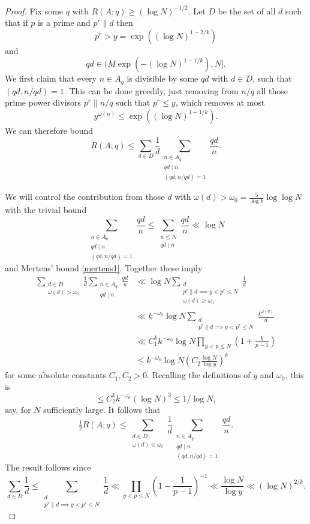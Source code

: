 \documentclass[12pt]{amsart}
\newcommand{\brac}[1]{\left( #1\right)}
\begin{document}
\begin{proof}
Fix some $q$ with $R(A;q)\geq (\log N)^{-1/2}$. Let $D$ be the set of all $d$ such that if $p$ is a prime and $p^r \| d$ then 
\[p^r>y=\exp((\log N)^{1-2/k})\]
and 
\[qd\in (M\exp(-(\log N)^{1-1/k}),N].\]
We first claim that every $n\in A_q$ is divisible by some $qd$ with $d\in D$, such that $(qd,n/qd)=1$. This can be done greedily, just removing from $n/q$ all those prime power divisors $p^r\| n/q$ such that $p^r\leq y$, which removes at most 
\[y^{\omega(n)}\leq  \exp((\log N)^{1-1/k}).\]
We can therefore bound
\[R(A;q) \leq \sum_{d\in D}\frac{1}{d}\sum_{\substack{n\in A_q\\ qd\mid n\\ (qd,n/qd)=1}}\frac{qd}{n}.\]

We will control the contribution from those $d$ with $\omega(d)>\omega_0= \frac{5}{\log k}\log\log N$ with the trivial bound
\[\sum_{\substack{n\in A_q\\ qd\mid n\\ (qd,n/qd)=1}}\frac{qd}{n} \leq \sum_{\substack{n\leq N\\ qd\mid n}}\frac{qd}{n}\ll \log N\]
and Mertens' bound \eqref{mertens1}. Together these imply
\begin{align*}
\sum_{\substack{d\in D\\ \omega(d)>\omega_0}}\frac{1}{d}\sum_{\substack{n\in A_q\\ qd\mid n}}\frac{qd}{n}
&\ll \log N\sum_{\substack{d\\ p^r\| d\implies y<p^r\leq N\\ \omega(d)\geq \omega_0}} \frac{1}{d}\\
&\ll
k^{-\omega_0}\log N\sum_{\substack{d\\ p^r\| d\implies y<p^r\leq N}} \frac{k^{\omega(d)}}{d}\\
&\ll C_1^kk^{-\omega_0}\log N\prod_{y<p\leq N}(1+\frac{k}{p-1}) \\
 &\leq k^{-\omega_0}\log N\brac{C_2\frac{\log N}{\log y}}^{k}
\end{align*}
for some absolute constants $C_1,C_2>0$. Recalling the definitions of $y$ and $\omega_0$, this is
\[\leq C_2^kk^{-\omega_0}(\log N)^3\leq 1/\log N,\]
say, for $N$ sufficiently large. It follows that
\[\tfrac{1}{2}R(A;q)\leq \sum_{\substack{d\in D\\ \omega(d)\leq \omega_0}}\frac{1}{d}\sum_{\substack{n\in A_q\\ qd\mid n\\ (qd,n/qd)=1}}\frac{qd}{n} .\]
The result follows since 
\[\sum_{d\in D}\frac{1}{d}\leq \sum_{\substack{d\\ p^r\| d\implies y<p^r\leq N}}\frac{1}{d} \ll \prod_{y<p\leq N}\brac{1-\frac{1}{p-1}}^{-1}\ll \frac{\log N}{\log y}\ll (\log N)^{2/k}.\]
\end{proof}
\end{document}
